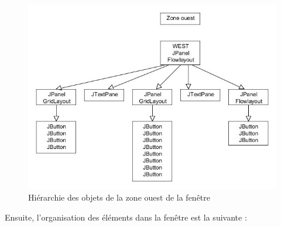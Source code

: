 \documentclass[12pt, a4paper]{article}
\begin{document}
\newpage
\begin{figure}[!h]
\begin{center}
   \includegraphics[scale = 0.7]{arbre_jframe_ouest.jpg}
	\caption{Hiérarchie des objets de la zone ouest de la fenêtre}
	\end{center}
\end{figure}
\newpage
Ensuite, l'organisation des éléments dans la fenêtre est la suivante :
\end{document}
